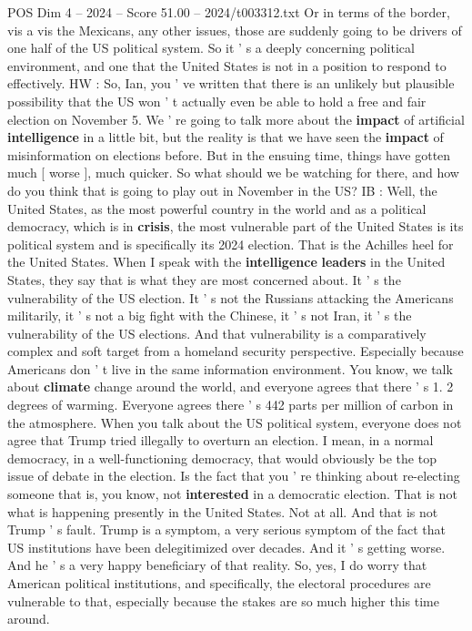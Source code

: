 \begin{textsample}{POS Dim 4 – 2024 – Score 51.00 – 2024/t003312.txt}
Or in terms of the border, vis a vis the Mexicans, any other issues, those are suddenly going to be drivers of one half of the US political system.
So it ' s a deeply concerning political environment, and one that the United States is not in a position to respond to effectively.
HW : So, Ian, you ' ve written that there is an unlikely but plausible possibility that the US won ' t actually even be able to hold a free and fair election on November 5.
We ' re going to talk more about the \textbf{impact} of artificial \textbf{intelligence} in a little bit, but the reality is that we have seen the \textbf{impact} of misinformation on elections before.
But in the ensuing time, things have gotten much [ worse ], much quicker.
So what should we be watching for there, and how do you think that is going to play out in November in the US?
IB : Well, the United States, as the most powerful country in the world and as a political democracy, which is in \textbf{crisis}, the most vulnerable part of the United States is its political system and is specifically its 2024 election.
That is the Achilles heel for the United States.
When I speak with the \textbf{intelligence} \textbf{leaders} in the United States, they say that is what they are most concerned about.
It ' s the vulnerability of the US election.
It ' s not the Russians attacking the Americans militarily, it ' s not a big fight with the Chinese, it ' s not Iran, it ' s the vulnerability of the US elections.
And that vulnerability is a comparatively complex and soft target from a homeland security perspective.
Especially because Americans don ' t live in the same information environment.
You know, we talk about \textbf{climate} change around the world, and everyone agrees that there ' s 1. 2 degrees of warming.
Everyone agrees there ' s 442 parts per million of carbon in the atmosphere.
When you talk about the US political system, everyone does not agree that Trump tried illegally to overturn an election.
I mean, in a normal democracy, in a well-functioning democracy, that would obviously be the top issue of debate in the election.
Is the fact that you ' re thinking about re-electing someone that is, you know, not \textbf{interested} in a democratic election.
That is not what is happening presently in the United States.
Not at all.
And that is not Trump ' s fault.
Trump is a symptom, a very serious symptom of the fact that US institutions have been delegitimized over decades.
And it ' s getting worse.
And he ' s a very happy beneficiary of that reality.
So, yes, I do worry that American political institutions, and specifically, the electoral procedures are vulnerable to that, especially because the stakes are so much higher this time around.

\end{textsample}
